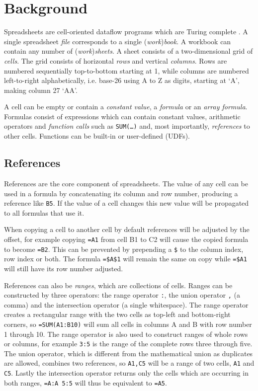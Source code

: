 \documentclass[conference]{IEEEtran}
\begin{document}
\section{Background}

Spreadsheets are cell-oriented dataflow programs which are Turing complete \cite{ExcelTuringComplete}.
A single spreadsheet \emph{file} corresponds to a single (\emph{work})\emph{book}.
A workbook can contain any number of (\emph{work})\emph{sheets}.
A sheet consists of a two-dimensional grid of \emph{cells}.
The grid consists of horizontal \emph{rows} and vertical \emph{columns}.
Rows are numbered sequentially top-to-bottom starting at 1, while columns are numbered left-to-right alphabetically, i.e. base-26 using A to Z as digits, starting at `A', making column 27 `AA'.

A cell can be empty or contain a \emph{constant value}, a \emph{formula} or an \emph{array formula}.
Formulas consist of expressions which can contain constant values, arithmetic operators and \emph{function calls} such as \texttt{SUM(\ldots)} and, most importantly, \emph{references} to other cells.
Functions can be built-in or user-defined (UDFs).

\subsection{References}
References are the core component of spreadsheets.
The value of any cell can be used in a formula by concatenating its column and row number, producing a reference like \texttt{B5}.
If the value of a cell changes this new value will be propagated to all formulas that use it.

When copying a cell to another cell by default references will be adjusted by the offset, for example copying \texttt{=A1} from cell B1 to C2 will cause the copied formula to become \texttt{=B2}.
This can be prevented by prepending a \texttt{\$} to the column index, row index or both.
The formula \texttt{=\$A\$1} will remain the same on copy while \texttt{=\$A1} will still have its row number adjusted.

References can also be \emph{ranges}, which are collections of cells.
Ranges can be constructed by three operators: the range operator \texttt{:}, the union operator \texttt{,} (a comma) and the intersection operator \texttt{} (a single whitespace).
The range operator creates a rectangular range with the two cells as top-left and bottom-right corners, so \texttt{=SUM(A1:B10)} will sum all cells in columns A and B with row number 1 through 10.
The range operator is also used to construct ranges of whole rows or columns, for example \texttt{3:5} is the range of the complete rows three through five.
The union operator, which is different from the mathematical union as duplicates are allowed, combines two references, so \texttt{A1,C5} will be a range of two cells, \texttt{A1} and \texttt{C5}.
Lastly the intersection operator returns only the cells which are occurring in both ranges, \texttt{=A:A 5:5} will thus be equivalent to \texttt{=A5}.
\end{document}
